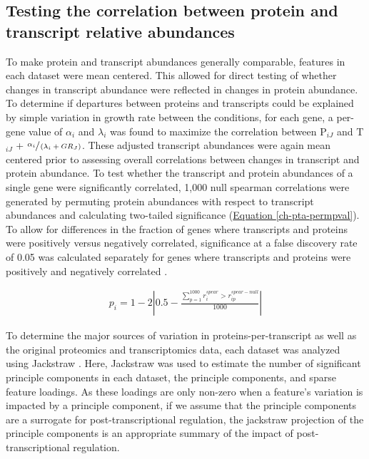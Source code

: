 \subsection{Testing the correlation between protein and transcript relative abundances}

To make protein and transcript abundances generally comparable, features in each dataset were mean centered. This allowed for direct testing of whether changes in transcript abundance were reflected in changes in protein abundance.  To determine if departures between proteins and transcripts could be explained by simple variation in growth rate between the conditions, for each gene, a per-gene value of $\alpha_{i}$ and $\lambda_{i}$ was found to maximize  the correlation between P$_{iJ}$ and T$_{iJ}$ + $\sfrac{\alpha_{i}}{\left(\lambda_{i} + GR_{J}\right)}$.  These adjusted transcript abundances were again mean centered prior to assessing overall correlations between changes in transcript and protein abundance. To test whether the transcript and protein abundances of a single gene were significantly correlated, 1,000 null spearman correlations were generated by permuting protein abundances with respect to transcript abundances and calculating two-tailed significance (\hyperref[ch-pta-permpval]{Equation \ref{ch-pta-permpval}}). To allow for differences in the fraction of genes where transcripts and proteins were positively versus negatively correlated, significance at a false discovery rate of 0.05 was calculated separately for genes where transcripts and proteins were positively and negatively correlated \cite{Storey:2003cj}.

\begin{align}
p_{i} = 1 - 2\left|0.5 - \frac{\sum_{p = 1}^{1000}r^{spear}_{i} > r_{ip}^{spear-null}}{1000}\label{ch-pta-permpval}\right|
\end{align}

To determine the major sources of variation in proteins-per-transcript as well as the original proteomics and transcriptomics data, each dataset was analyzed using Jackstraw \cite{Chung:2015bq}. Here, Jackstraw was used to estimate the number of significant principle components in each dataset, the principle components, and sparse feature loadings. As these loadings are only non-zero when a feature's variation is impacted by a principle component, if we assume that the principle components are a surrogate for post-transcriptional regulation, the jackstraw projection of the principle components is an appropriate summary of the impact of post-transcriptional regulation.

